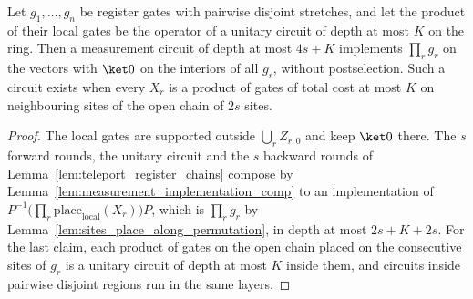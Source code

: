 \begin{theorem}
    \label{thm:teleport_register_layer}
    \leanok
    Let $g_1,\dots,g_n$ be register gates with pairwise disjoint stretches, and
    let the product of their local gates be the operator of a unitary circuit
    of depth at most $K$ on the ring. Then a measurement circuit of depth at
    most $4s+K$ implements $\prod_rg_r$ on the vectors with $\ket0$ on the
    interiors of all $g_r$, without postselection. Such a circuit exists when
    every $X_r$ is a product of gates of total cost at most $K$ on neighbouring
    sites of the open chain of $2s$ sites.
\end{theorem}
\begin{proof}
    \leanok
    The local gates are supported outside $\bigcup_rZ_{r,0}$ and keep $\ket0$
    there. The $s$ forward rounds, the unitary circuit and the $s$ backward
    rounds of Lemma~\ref{lem:teleport_register_chains} compose by
    Lemma~\ref{lem:measurement_implementation_comp} to an implementation of
    $P^{-1}\bigl(\prod_r\mathrm{place}_{\mathrm{local}}(X_r)\bigr)P$, which is
    $\prod_rg_r$ by Lemma~\ref{lem:sites_place_along_permutation}, in depth at
    most $2s+K+2s$. For the last claim, each product of gates on the open chain
    placed on the consecutive sites of $g_r$ is a unitary circuit of depth at
    most $K$ inside them, and circuits inside pairwise disjoint regions run in
    the same layers.
\end{proof}
